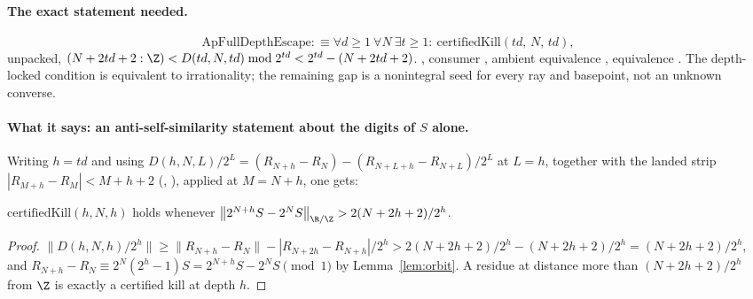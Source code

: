 \paragraph{The exact statement needed.}
\[
  \mathrm{ApFullDepthEscape} :\equiv
  \forall d\ge 1\ \forall N\ \exists t\ge 1:\ \mathrm{certifiedKill}(td,\,N,\,td),
\]
unpacked, $(N+2td+2:\Z)<D(td,N,td)\bmod 2^{td}<2^{td}-(N+2td+2)$.
,
consumer
,
ambient equivalence
,
equivalence
\quad {} \quad {}. The depth-locked condition is
equivalent to irrationality; the remaining gap is a nonintegral seed for every
ray and basepoint, not an unknown converse.

\paragraph{What it says: an anti-self-similarity statement about the digits
of $S$ alone.}
Writing $h=td$ and using
$D(h,N,L)/2^{L}=(R_{N+h}-R_N)-(R_{N+L+h}-R_{N+L})/2^{L}$ at $L=h$, together
with the landed strip $|R_{M+h}-R_M|<M+h+2$
(,
), applied at $M=N+h$, one gets:

\begin{prop}\label{prop:route4}
$\mathrm{certifiedKill}(h,N,h)$ holds whenever
$\bigl\|2^{N+h}S-2^{N}S\bigr\|_{\R/\Z}>2(N+2h+2)/2^{h}$.
\end{prop}

\begin{proof}
$\|D(h,N,h)/2^{h}\|\ge\|R_{N+h}-R_N\|-|R_{N+2h}-R_{N+h}|/2^{h}
 >2(N+2h+2)/2^{h}-(N+2h+2)/2^{h}=(N+2h+2)/2^{h}$, and
$R_{N+h}-R_N\equiv 2^{N}(2^{h}-1)S=2^{N+h}S-2^{N}S\pmod 1$ by
Lemma~\ref{lem:orbit}. A residue at distance more than $(N+2h+2)/2^{h}$ from
$\Z$ is exactly a certified kill at depth $h$.
\end{proof}

